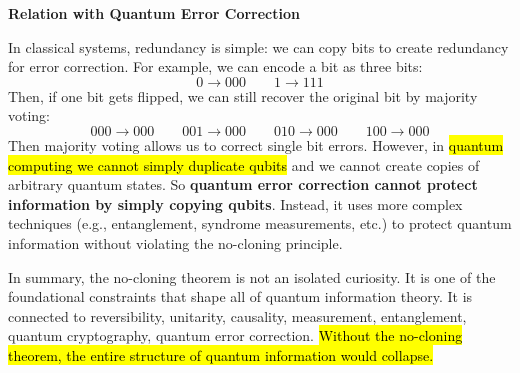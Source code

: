 \begin{flushleft}
    \textcolor{Red2}{ \textbf{Relation with Quantum Error Correction}}
\end{flushleft}
In classical systems, redundancy is simple: we can copy bits to create redundancy for error correction. For example, we can encode a bit as three bits:
\begin{equation*}
    0 \rightarrow 000 \quad\quad 1 \rightarrow 111
\end{equation*}
Then, if one bit gets flipped, we can still recover the original bit by majority voting:
\begin{equation*}
    000 \rightarrow 000 \quad\quad 001 \rightarrow 000 \quad\quad 010 \rightarrow 000 \quad\quad 100 \rightarrow 000
\end{equation*}
Then majority voting allows us to correct single bit errors. However, in \hl{quantum computing we cannot simply duplicate qubits} and we cannot create copies of arbitrary quantum states. So \textbf{quantum error correction cannot protect information by simply copying qubits}. Instead, it uses more complex techniques (e.g., entanglement, syndrome measurements, etc.) to protect quantum information without violating the no-cloning principle.

\highspace
In summary, the no-cloning theorem is not an isolated curiosity. It is one of the foundational constraints that shape all of quantum information theory. It is connected to reversibility, unitarity, causality, measurement, entanglement, quantum cryptography, quantum error correction. \hl{Without the no-cloning theorem, the entire structure of quantum information would collapse.}